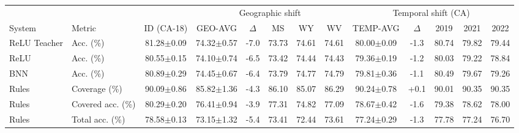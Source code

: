 \begin{tabular}{llccccccccccc}
\toprule
 & & & \multicolumn{5}{c}{Geographic shift} & \multicolumn{5}{c}{Temporal shift (CA)} \\
System & Metric & ID (CA-18) & GEO-AVG & $\Delta$ & MS & WY & WV & TEMP-AVG & $\Delta$ & 2019 & 2021 & 2022 \\
\midrule
ReLU Teacher & Acc. (\%) & 81.28$\pm$0.09 & 74.32$\pm$0.57 & -7.0 & 73.73 & 74.61 & 74.61 & 80.00$\pm$0.09 & -1.3 & 80.74 & 79.82 & 79.44 \\
\midrule
ReLU & Acc. (\%) & 80.55$\pm$0.15 & 74.10$\pm$0.74 & -6.5 & 73.42 & 74.44 & 74.43 & 79.36$\pm$0.19 & -1.2 & 80.03 & 79.22 & 78.84 \\
\midrule
BNN & Acc. (\%) & 80.89$\pm$0.29 & 74.45$\pm$0.67 & -6.4 & 73.79 & 74.77 & 74.79 & 79.81$\pm$0.36 & -1.1 & 80.49 & 79.67 & 79.26 \\
\midrule
Rules & Coverage (\%) & 90.09$\pm$0.86 & 85.82$\pm$1.36 & -4.3 & 86.10 & 85.07 & 86.29 & 90.24$\pm$0.78 & +0.1 & 90.01 & 90.35 & 90.35 \\
Rules & Covered acc. (\%) & 80.29$\pm$0.20 & 76.41$\pm$0.94 & -3.9 & 77.31 & 74.82 & 77.09 & 78.67$\pm$0.42 & -1.6 & 79.38 & 78.62 & 78.00 \\
Rules & Total acc. (\%) & 78.58$\pm$0.13 & 73.15$\pm$1.32 & -5.4 & 73.41 & 72.44 & 73.61 & 77.24$\pm$0.29 & -1.3 & 77.78 & 77.24 & 76.70 \\
\bottomrule
\end{tabular}
